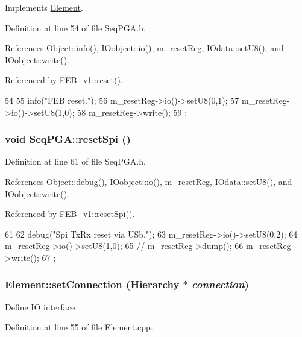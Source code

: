 Implements \hyperlink{classElement_a69efffa22f06909d768149715565cb56}{Element}.

Definition at line 54 of file SeqPGA.h.

References Object::info(), IOobject::io(), m\_\-resetReg, IOdata::setU8(), and IOobject::write().

Referenced by FEB\_\-v1::reset().


\begin{DoxyCode}
54                {
55     info("FEB reset.");
56     m_resetReg->io()->setU8(0,1);
57     m_resetReg->io()->setU8(1,0);
58     m_resetReg->write();
59   };
\end{DoxyCode}
\hypertarget{classSeqPGA_a52f122a1767691eb950a4aae5981edfc}{
\subsubsection[{resetSpi}]{\setlength{\rightskip}{0pt plus 5cm}void SeqPGA::resetSpi ()}}
\label{classSeqPGA_a52f122a1767691eb950a4aae5981edfc}


Definition at line 61 of file SeqPGA.h.

References Object::debug(), IOobject::io(), m\_\-resetReg, IOdata::setU8(), and IOobject::write().

Referenced by FEB\_\-v1::resetSpi().


\begin{DoxyCode}
61                   {
62     debug("Spi TxRx reset via USb.");
63     m_resetReg->io()->setU8(0,2);
64     m_resetReg->io()->setU8(1,0);
65     //    m_resetReg->dump();
66     m_resetReg->write();
67   };
\end{DoxyCode}
\hypertarget{classElement_ab476b4b1df5954141ceb14f072433b89}{
\subsubsection[{setConnection}]{ Element::setConnection ({\bf Hierarchy} $\ast$ {\em connection})}}
\label{classElement_ab476b4b1df5954141ceb14f072433b89}
Define IO interface 

Definition at line 55 of file Element.cpp.

